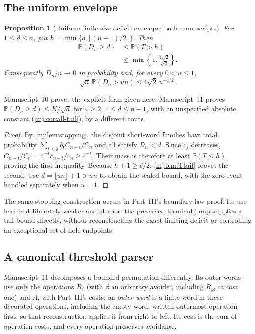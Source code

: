 \documentclass[11pt,a4paper]{article}
\newtheorem{proposition}[proposition]{Proposition}
\theoremstyle{definition}\newaliascnt{definition}{theorem}
\theoremstyle{remark}\newaliascnt{remark}{theorem}
\newcommand{\ljP}{\mathbb P}
\begin{document}
\subsection{The uniform envelope}
\begin{proposition}[Uniform finite-size deficit envelope; both manuscripts]
\label{mj:prop:envelope}
For $1\le d\le n$, put $h=\min\{d,\lfloor(n-1)/2\rfloor\}$. Then
\begin{align}
 \ljP(D_n\ge d)
 &\le\ljP(T>h)\label{mj:eq:exact-envelope}\\
 &\le\min\left\{1,\frac{4\sqrt2}{\sqrt d}\right\}.
 \label{mj:eq:uniform-envelope}
\end{align}
Consequently $D_n/n\to0$ in probability and, for every $0<u\le1$,
\begin{equation}
 \sqrt n\,\ljP(D_n>un)\le4\sqrt2\,u^{-1/2}.
 \label{mj:eq:scaled-envelope}
\end{equation}
\end{proposition}
Manuscript~10 proves the explicit form given here. Manuscript~11 proves
$\ljP(D_n\ge d)\le K/\sqrt d$ for $n\ge2$, $1\le d\le n-1$, with an
unspecified absolute constant (\cref{mj:cor:all-tail}), by a different
route.
\begin{proof}
By \cref{mj:lem:stopping}, the disjoint short-word families have total
probability $\sum_{t\le h}b_tC_{n-t}/C_n$ and all satisfy $D_n<d$. Since
$c_j$ decreases, $C_{n-t}/C_n=4^{-t}c_{n-t}/c_n\ge4^{-t}$. Their mass is
therefore at least $\ljP(T\le h)$, proving the first inequality. Because
$h+1\ge d/2$, \cref{mj:lem:Ttail} proves the second. Use
$d=\lfloor un\rfloor+1>un$ to obtain the scaled bound, with the zero event
handled separately when $u=1$.
\end{proof}

The same stopping construction occurs in Part~III's boundary-law proof. Its
use here is deliberately weaker and cleaner: the preserved terminal jump
supplies a tail bound directly, without reconstructing the exact limiting
deficit or controlling an exceptional set of hole endpoints.

\subsection{A canonical threshold parser}
\label{mj:sec:parser}
Manuscript~11 decomposes a bounded permutation differently. Its outer words
use only the operations $R_\beta$ (with $\beta$ an arbitrary avoider,
including $R_\varnothing$ at cost one) and $A$, with Part~III's costs; an
\emph{outer word} is a finite word in these decorated operations, including
the empty word, written outermost operation first, so that reconstruction
applies it from right to left. Its cost is the sum of operation costs, and
every operation preserves avoidance.
\end{document}

